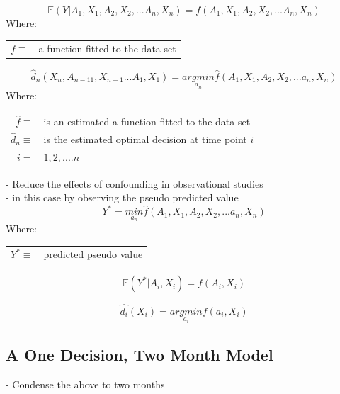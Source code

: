 \documentclass[10pt]{article}
\begin{document}
\begin{equation}
\mathds{E}(Y|A_1,X_1,A_2,X_2,...A_n,X_n) = f(A_1,X_1,A_2,X_2,...A_n,X_n)
\end{equation}
Where:
\begin{table}[H]
	\centering
	\begin{tabular}{r l}
		$f \equiv$ & a function fitted to the data set \\
	\end{tabular} 
\end{table}

\begin{equation}
\hat{d}_n(X_n, A_{n-11}, X_{n-1}...A_1,X_1) = \underset{a_n}{argmin}\hat{f}(A_1,X_1,A_2,X_2,...a_n,X_n) 
\end{equation}
Where:
\begin{table}[H]
	\centering
	\begin{tabular}{r l}
		$\hat{f} \equiv$ & is an estimated a function fitted to the data set \\
		$\hat{d}_n \equiv$ & is the estimated optimal decision at time point $i$ \\
		$i =$ & $1,2,....n$ \\
	\end{tabular} 
\end{table}


- Reduce the effects of confounding in observational studies \\

- in this case by observing the pseudo predicted value
\begin{equation}
Y^* = \underset{a_n}{min}\hat{f}(A_1,X_1,A_2,X_2,...a_n,X_n)
\end{equation}
Where:
\begin{table}[H]
	\centering
	\begin{tabular}{r l}
		$Y^* \equiv$ & predicted pseudo value \\
	\end{tabular} 
\end{table}

\begin{equation}
\mathds{E}(Y^*|A_i,X_i) = f(A_i,X_i)
\end{equation}

\begin{equation}
\hat{d_i}(X_i)= \underset{a_i}{argmin}f(a_i, X_i)
\end{equation}
\subsection{A One Decision, Two Month Model} %
- Condense the above to two months\\
\end{document}
